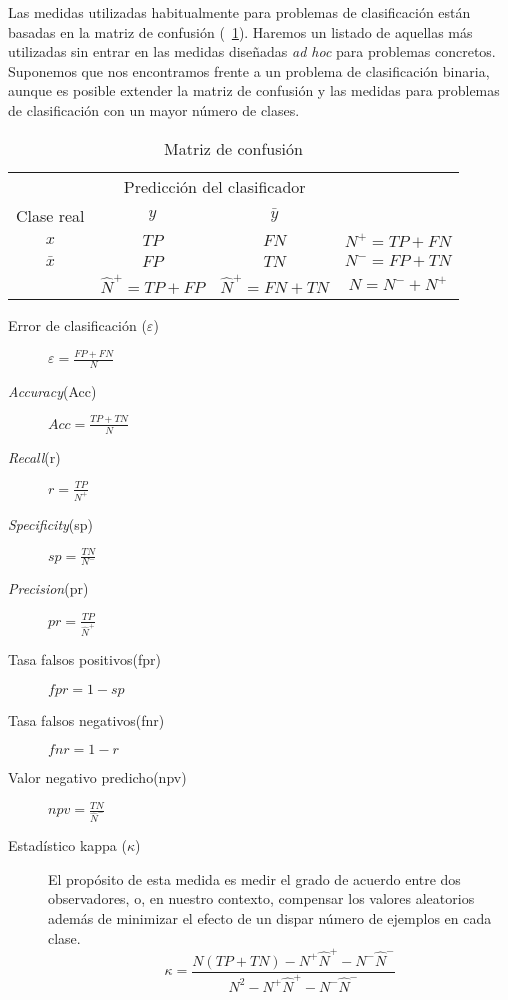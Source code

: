 	Las medidas utilizadas habitualmente para problemas de clasificación están basadas en la matriz de confusión (~\ref{tab:matrizconfusion}). Haremos un listado de aquellas más utilizadas sin entrar en las medidas diseñadas \textit{ad hoc} para problemas concretos. Suponemos que nos encontramos frente a un problema de clasificación binaria, aunque es posible extender la matriz de confusión y las medidas para problemas de clasificación con un mayor número de clases.

\begin{table}[H]
\centering
\begin{tabular}{cccc}
\cline{1-3}
\multicolumn{1}{|c|}{}           & \multicolumn{2}{c|}{Predicción del clasificador}      &                 \\ \cline{1-3}
\multicolumn{1}{|c|}{Clase real} & \multicolumn{1}{c|}{$y$}    & \multicolumn{1}{c|}{$\bar{y}$}    &                 \\ \cline{1-3}
\multicolumn{1}{|c|}{$x$}          & \multicolumn{1}{c|}{$TP$} & \multicolumn{1}{c|}{$FN$} & $N^+ = TP + FN$ \\ \cline{1-3}
\multicolumn{1}{|c|}{$\bar{x}$}          & \multicolumn{1}{c|}{$FP$} & \multicolumn{1}{c|}{$TN$} & $N^- = FP + TN$ \\ \cline{1-3}
                                & $\hat{N}^+ = TP + FP$     & $\hat{N}^+ = FN + TN$     &   $N = N^- + N^+$             
\end{tabular}
\caption{Matriz de confusión}
\label{tab:matrizconfusion}
\end{table} 
	
\begin{description}
	\item[Error de clasificación ($\varepsilon$)] $\varepsilon = \frac{FP+FN}{N}$
	\item[\textit{Accuracy}(Acc)] $Acc=\frac{TP+TN}{N}$
	\item[\textit{Recall}(r)] $r=\frac{TP}{N^+}$
	\item[\textit{Specificity}(sp)] $sp=\frac{TN}{N^-}$
	\item[\textit{Precision}(pr)] $pr=\frac{TP}{\hat{N}^+}$
	\item[Tasa falsos positivos(fpr)] $fpr=1-sp$
	\item[Tasa falsos negativos(fnr)] $fnr=1-r$
	\item[Valor negativo predicho(npv)] $npv=\frac{TN}{\hat{N}^-}$
	\item[Estadístico kappa ($\kappa$)] El propósito de esta medida es medir el grado de acuerdo entre dos observadores, o, en nuestro contexto, compensar los valores aleatorios además de minimizar el efecto de un dispar número de ejemplos en cada clase. 
	\[ 
	\kappa = \frac{N(TP + TN) - N^+\hat{N}^+ - N^-\hat{N}^- }
				  {N^2 - N^+\hat{N}^+ - N^-\hat{N}^- }
	\]
\end{description}
	
